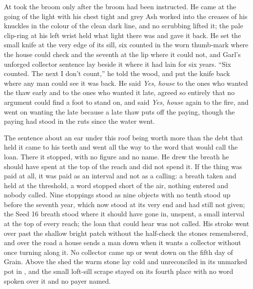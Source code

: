 \scenebreak

At   took the broom only after the broom had been instructed. He came at the going of the light with his chest tight and grey Ash worked into the creases of his knuckles in the colour of the clean dark line, and no scrubbing lifted it; the pale clip-ring at his left wrist held what light there was and gave it back. He set the small knife at the very edge of its sill, six counted in the worn thumb-mark where the house could check and the seventh at the lip where it could not, and Garl's unforged collector sentence lay beside it where it had lain for six years. “Six counted. The next I don't count,” he told the wood, and put the knife back where any man could see it was back. He said \emph{Yes, house} to the ones who wanted the thaw early and to the ones who wanted it late, agreed so entirely that no argument could find a foot to stand on, and said \emph{Yes, house} again to the fire, and went on wanting the late because a late thaw puts off the paying, though the paying had stood in the ruts since the water went.

The sentence about an ear under this roof being worth more than the debt that held it came to his teeth and went all the way to the word that would call the loan. There it stopped, with no figure and no name. He drew the breath he should have spent at the top of the reach and did not spend it. If the thing was paid at all, it was paid as an interval and not as a calling: a breath taken and held at the threshold, a word stopped short of the air, nothing entered and nobody called. Nine stoppings stood as nine objects with no tenth stood up before the seventh year, which now stood at its very end and had still not given; the Seed 16 breath stood where it should have gone in, unspent, a small interval at the top of every reach; the loan that could hear was not called. His stroke went over  past the shallow bright patch without the half-check the stones remembered, and over the road a house sends a man down when it wants a collector without once turning along it. No collector came up or went down  on the fifth day of Grain. Above the shed the warm stone lay cold and unreconciled in its unmarked pot in , and the small loft-sill scrape stayed on its fourth place with no word spoken over it and no payer named.

\scenebreak

